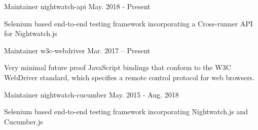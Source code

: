

\begin{cventries}

  \cventry
    {Maintainer} %
    {nightwatch-api} %
    {} %
    {May. 2018 - Present} %
    {
      \begin{cvitems} %
        \item {Selenium based end-to-end testing framework incorporating a Cross-runner API for Nightwatch.js}
      \end{cvitems}
    }

  \cventry
    {Maintainer} %
    {w3c-webdriver} %
    {} %
    {Mar. 2017 – Present} %
    {
      \begin{cvitems} %
        \item {Very minimal future proof JavaScript bindings that conform to the W3C WebDriver standard, which specifies a remote control protocol for web browsers.}
      \end{cvitems}
    }

  \cventry
    {Maintainer} %
    {nightwatch-cucumber} %
    {} %
    {May. 2015 - Aug. 2018} %
    {
      \begin{cvitems} %
        \item {Selenium based end-to-end testing framework incorporating Nightwatch.js and Cucumber.js}
      \end{cvitems}
    }

\end{cventries}
